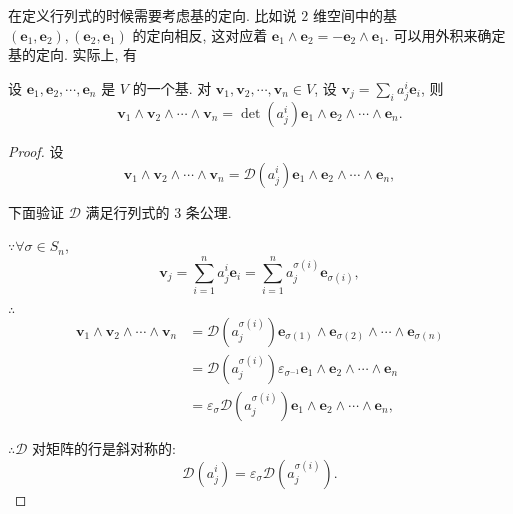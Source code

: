\documentclass{ctexart}
\begin{document}
在定义行列式的时候需要考虑基的定向. 比如说 $2$ 维空间中的基 $(\boldsymbol{e}_1,\boldsymbol{e}_2),(\boldsymbol{e}_2,\boldsymbol{e}_1)$ 的定向相反, 这对应着 $\boldsymbol{e}_1\land\boldsymbol{e}_2=-\boldsymbol{e}_2\land\boldsymbol{e}_1$. 可以用外积来确定基的定向. 实际上, 有
\begin{theorem}[书上的定理 5]\label{t4.3}
    设 $\boldsymbol{e}_1,\boldsymbol{e}_2,\cdots,\boldsymbol{e}_n$ 是 $V$ 的一个基. 对 $\boldsymbol{v}_1,\boldsymbol{v}_2,\cdots,\boldsymbol{v}_n\in V$, 设 $\boldsymbol{v}_j=\sum\limits_{i}a_j^i\boldsymbol{e}_i$, 则
    \[\boldsymbol{v}_1\wedge\boldsymbol{v}_2\wedge\cdots\wedge\boldsymbol{v}_n=\operatorname{det}(a_j^i)\boldsymbol{e}_1\wedge\boldsymbol{e}_2\wedge\cdots\wedge\boldsymbol{e}_n.\]
\end{theorem}
\begin{proof}
    设
    \[\boldsymbol{v}_1\wedge\boldsymbol{v}_2\wedge\cdots\wedge\boldsymbol{v}_n=\mathcal{D}(a_j^i)\boldsymbol{e}_1\wedge\boldsymbol{e}_2\wedge\cdots\wedge\boldsymbol{e}_n,\]

    下面验证 $\mathcal{D}$ 满足行列式的 3 条公理.

    $\because\forall\sigma\in S_n$,
    \[\boldsymbol{v}_j=\sum\limits_{i=1}^na_j^i\boldsymbol{e}_i=\sum\limits_{i=1}^na_j^{\sigma(i)}\boldsymbol{e}_{\sigma(i)},\]

    $\therefore$
    \begin{align*}
        \boldsymbol{v}_1\wedge\boldsymbol{v}_2\wedge\cdots\wedge\boldsymbol{v}_n & =\mathcal{D}(a_j^{\sigma(i)})\boldsymbol{e}_{\sigma(1)}\wedge\boldsymbol{e}_{\sigma(2)}\wedge\cdots\wedge\boldsymbol{e}_{\sigma(n)} \\
        & =\mathcal{D}(a_j^{\sigma(i)})\varepsilon_{\sigma^{-1}}\boldsymbol{e}_1\wedge\boldsymbol{e}_2\wedge\cdots\wedge\boldsymbol{e}_n \\
        & =\varepsilon_{\sigma}\mathcal{D}(a_j^{\sigma(i)})\boldsymbol{e}_1\wedge\boldsymbol{e}_2\wedge\cdots\wedge\boldsymbol{e}_n,
    \end{align*}

    $\therefore\mathcal{D}$ 对矩阵的行是斜对称的:
    \[\mathcal{D}(a_j^i)=\varepsilon_{\sigma}\mathcal{D}(a_j^{\sigma(i)}).\]


\end{proof}
\end{document}
